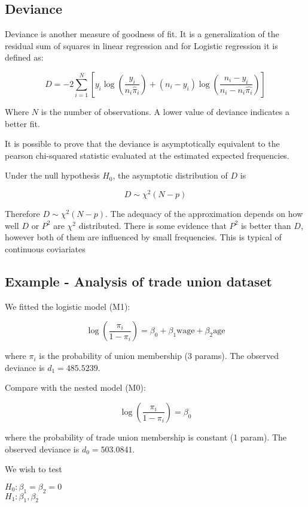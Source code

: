 \documentclass[11pt]{article}
\begin{document}
\subsection{Deviance}

Deviance is another measure of goodness of fit. It is a generalization of the residual sum of squares in linear regression and for Logistic regression it is defined as:

\[ D = -2 \sum_{i=1}^N \left[ y_i \log \left( \dfrac{y_i}{n_i \hat{\pi}_i} \right) + (n_i - y_i) \log \left( \dfrac{n_i - y_i}{n_i - n_i \hat{\pi_i}} \right) \right] \]

Where \(N\) is the number of observations. A lower value of deviance indicates a better fit.

It is possible to prove that the deviance is asymptotically equivalent to the pearson chi-squared statistic evaluated at the estimated expected frequencies.

Under the null hypothesis $H_0$, the asymptotic distribution of $D$ is

\[ D \sim \chi^2 (N-p)\]

Therefore $D \sim \chi^2 (N - p)$. The adequacy of the approximation depends on how well $D$ or $P^2$ are $\chi^2$ distributed. There is some evidence that $P^2$ is better than $D$, however both of them are influenced by small frequencies. This is typical of continuous coviariates

\subsection{Example - Analysis of trade union dataset}


We fitted the logistic model (M1):

\[ \log \left( \frac{\pi_i}{1 - \pi_i} \right) = \beta_0 + \beta_1 \text{wage} + \beta_2 \text{age} \]

where \(\pi_i\) is the probability of union membership (3 params). The observed deviance is \(d_1 = 485.5239\).

Compare with the nested model (M0):

\[ \log \left( \frac{\pi_i}{1 - \pi_i} \right) = \beta_0 \]

where the probability of trade union membership is constant (1 param). The observed deviance is \(d_0 = 503.0841\).

We wish to test

\begin{center}
    \( H_0 : \beta_1 = \beta_2 = 0\) \\
    \( H_1 : \beta_1, \beta_2\)  \\
\end{center}
\end{document}
